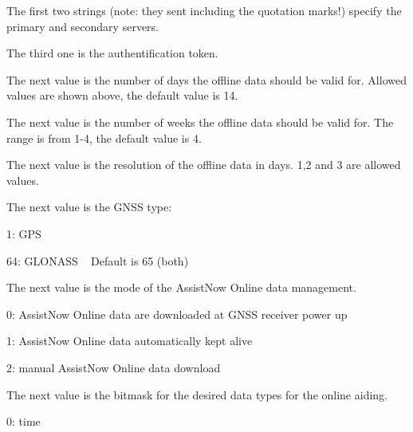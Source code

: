\begin{DoxyItemize}
\item The first two strings (note\+: they sent including the quotation marks!) specify the primary and secondary servers.
\item The third one is the authentification token.
\item The next value is the number of days the offline data should be valid for. Allowed values are shown above, the default value is 14.
\item The next value is the number of weeks the offline data should be valid for. The range is from 1-\/4, the default value is 4.
\item The next value is the resolution of the offline data in days. 1,2 and 3 are allowed values.
\item The next value is the G\+N\+SS type\+: ~\newline

\begin{DoxyItemize}
\item 1\+: G\+PS ~\newline

\item 64\+: G\+L\+O\+N\+A\+SS ~\newline
Default is 65 (both)
\end{DoxyItemize}
\item The next value is the mode of the Assist\+Now Online data management.~\newline

\begin{DoxyItemize}
\item 0\+: Assist\+Now Online data are downloaded at G\+N\+SS receiver power up~\newline

\item 1\+: Assist\+Now Online data automatically kept alive~\newline

\item 2\+: manual Assist\+Now Online data download~\newline

\end{DoxyItemize}
\item The next value is the bitmask for the desired data types for the online aiding. ~\newline

\begin{DoxyItemize}
\item 0\+: time~\newline


\end{DoxyItemize}
\end{DoxyItemize}
